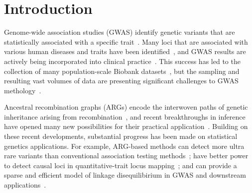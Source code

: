 \documentclass[unnumsec,webpdf,modern,large,namedate]{oup-authoring-template}%
\begin{document}

\maketitle

\section{Introduction}

Genome-wide association studies (GWAS)
identify genetic variants that are statistically
associated with a specific trait~\citep{uffelmann2021}.
Many loci that are associated with various human diseases and
traits have been identified~\citep{locke2015,ishigaki2022,
mahajan2022,yengo2022,mathieson2023},
and GWAS results are actively being incorporated into clinical
practice~\citep{visscher2017}.
This success has led to the collection of many population-scale Biobank
datasets~\citep{tanjo2021practical},
but the sampling and resulting vast volumes of data
are presenting significant challenges to GWAS
methology~\citep{uffelmann2021}.

Ancestral recombination graphs (ARGs) encode the interwoven paths
of genetic inheritance arising from
recombination~\citep{hudson1983properties,griffiths1997ancestral,wong2023general},
and recent
breakthroughs in inference have opened many new possibilities for their
practical application~\citep{lewanski2023era}.
Building on these recent developments, substantial progress has been made
on statistical genetics applications.
For example,  ARG-based methods
can detect more ultra rare variants than conventional association testing
methods~\citep{zhang2023};
have better power to detect causal loci in
quantitative-trait locus mapping~\citep{link2023tree};
and can provide a sparse and efficient model of linkage disequilibirium
in GWAS and downstream applications~\citep{nowbandegani2023extremely}.
\end{document}
